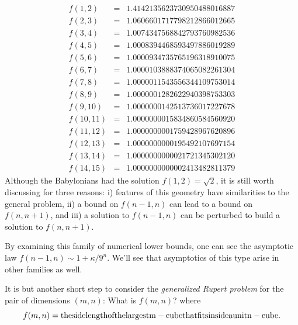 \documentclass[superscriptaddress,reprint,amsmath,amssymb,aps]{revtex4-1}
\begin{document}
\vspace{-0.10in}
\begin{equation*}
  \begin{matrix}
    f( 1, 2) & = & 1.4142135623730950488016887 \\
    f( 2, 3) & = & 1.0606601717798212866012665 \\
    f( 3, 4) & = & 1.0074347568842793760982536 \\
    f( 4, 5) & = & 1.0008394468593497886019289 \\
    f( 5, 6) & = & 1.0000934735765196318910075 \\
    f( 6, 7) & = & 1.0000103888374065082261304 \\
    f( 7, 8) & = & 1.0000011543556344109753014 \\
    f( 8, 9) & = & 1.0000001282622940398753303 \\
    f( 9,10) & = & 1.0000000142513736017227678 \\
    f(10,11) & = & 1.0000000015834860584560920 \\
    f(11,12) & = & 1.0000000001759428967620896 \\
    f(12,13) & = & 1.0000000000195492107697154 \\
    f(13,14) & = & 1.0000000000021721345302120 \\
    f(14,15) & = & 1.0000000000002413482811379
  \end{matrix}
\end{equation*}
Although the Babylonians had the solution $f(1,2)=\sqrt{2}$\cite{neugebauer}, it is still worth discussing for three reasons: i) features of this geometry have similarities to the general problem, ii) a bound on $f(n-1,n)$ can lead to a bound on $f(n,n+1)$, and iii) a solution to $f(n-1,n)$ can be perturbed to build a solution to $f(n,n+1)$.

By examining this family of numerical lower bounds, one can see the asymptotic law 
$f(n-1,n) \sim 1+\kappa/9^{n}$.
We'll see that asymptotics of this type arise in other families as well.

It is but another short step to consider the {\it generalized Rupert problem} for the pair of dimensions $(m,n)$: What is $f(m,n)$? where
\begin{equation*}
f(m,n) = {\rm the sidelength of the largest m-cube that fits inside a unit n-cube.}
\end{equation*}
\end{document}
